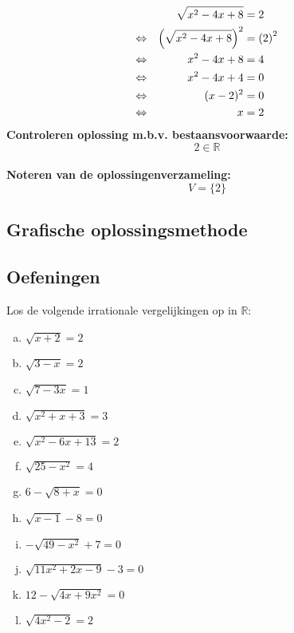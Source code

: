\documentclass[12pt,twoside]{article}
\begin{document}
\begin{enumerate}[(a)]
  \begin{align*}
         && \sqrt{x^2-4x+8} &= 2 \\
    \Leftrightarrow && \left(\sqrt{x^2-4x+8}\right)^2 &= \left(2\right)^2\\
    \Leftrightarrow && x^2-4x+8 &= 4\\
    \Leftrightarrow && x^2-4x+4 &= 0\\
    \Leftrightarrow && (x-2)^2 &= 0\\
    \Leftrightarrow && x &= 2\\
  \end{align*}
  {\bf Controleren oplossing m.b.v. bestaansvoorwaarde:}\\
  $$2\in\mathbb{R}$$\\
  {\bf Noteren van de oplossingenverzameling:}\\
  $$V=\{2\}$$
\end{enumerate}

\subsection{Grafische oplossingsmethode}


\subsection{Oefeningen}

\begin{oefening}
Los de volgende irrationale vergelijkingen op in $\mathbb{R}$:
\begin{multicols}{2}
\begin{enumerate}[(a)]
  \item $\sqrt{x+2}=2$
  \item $\sqrt{3-x}=2$
  \item $\sqrt{7-3x}=1$
  \item $\sqrt{x^2+x+3}=3$
  \item $\sqrt{x^2-6x+13}=2$
  \item $\sqrt{25-x^2}=4$
  \item $6-\sqrt{8+x}=0$
  \item $\sqrt{x-1}-8=0$
  \item $-\sqrt{49-x^2}+7=0$
  \item $\sqrt{11x^2+2x-9}-3=0$
  \item $12-\sqrt{4x+9x^2}=0$
  \item $\sqrt{4x^2-2}=2$
\end{enumerate}
\end{multicols}
\end{oefening}
\end{document}
